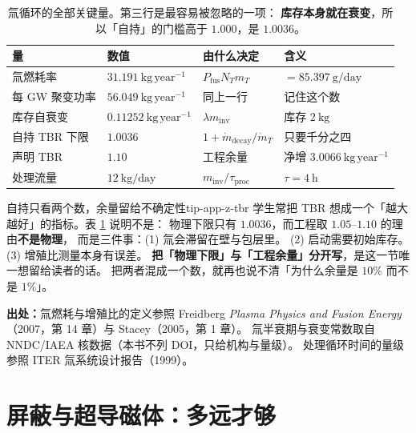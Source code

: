 \begin{table}[htbp]
\centering
\small
\caption{氚循环的全部关键量。第三行是最容易被忽略的一项：
\textbf{库存本身就在衰变}，所以「自持」的门槛高于 $1.000$，是 $1.0036$。}
\label{tab:app-z-tritium}
\begin{tabular}{p{3.4cm}p{3.4cm}p{3.2cm}p{3.1cm}}
\toprule
量 & 数值 & 由什么决定 & 含义 \\
\midrule
氚燃耗率 & $31.191\ \mathrm{kg\,year^{-1}}$ & $P_{\mathrm{fus}}N_Tm_T$ & $=85.397\ \mathrm{g/day}$ \\
每 GW 聚变功率 & $56.049\ \mathrm{kg\,year^{-1}}$ & 同上一行 & 记住这个数 \\
库存自衰变 & $0.11252\ \mathrm{kg\,year^{-1}}$ & $\lambda m_{\mathrm{inv}}$ & 库存 $2\ \mathrm{kg}$ \\
自持 TBR 下限 & $1.0036$ & $1+\dot m_{\mathrm{decay}}/\dot m_T$ & 只要千分之四 \\
声明 TBR & $1.10$ & 工程余量 & 净增 $3.0066\ \mathrm{kg\,year^{-1}}$ \\
处理流量 & $12\ \mathrm{kg/day}$ & $m_{\mathrm{inv}}/\tau_{\mathrm{proc}}$ & $\tau = 4\ \mathrm{h}$ \\
\bottomrule
\end{tabular}

\end{table}

\begin{tip}{自持只看两个数，余量留给不确定性}{tip-app-z-tbr}
学生常把 TBR 想成一个「越大越好」的指标。表 \ref{tab:app-z-tritium} 说明不是：
物理下限只有 $1.0036$，而工程取 $1.05$--$1.10$ 的理由\textbf{不是物理}，
而是三件事：(1) 氚会滞留在壁与包层里。
(2) 启动需要初始库存。
(3) 增殖比测量本身有误差。
\textbf{把「物理下限」与「工程余量」分开写}，是这一节唯一想留给读者的话。
把两者混成一个数，就再也说不清「为什么余量是 $10\%$ 而不是 $1\%$」。
\end{tip}

{\footnotesize
\textbf{出处：}氚燃耗与增殖比的定义参照 Freidberg \emph{Plasma Physics and Fusion
Energy}（2007，第 14 章）与 Stacey（2005，第 1 章）。
氚半衰期与衰变常数取自
NNDC/IAEA 核数据（本书不列 DOI，只给机构与量级）。
处理循环时间的量级
参照 ITER 氚系统设计报告（1999）。
}

\section{屏蔽与超导磁体：多远才够}
\label{sec:app-z-shield}

